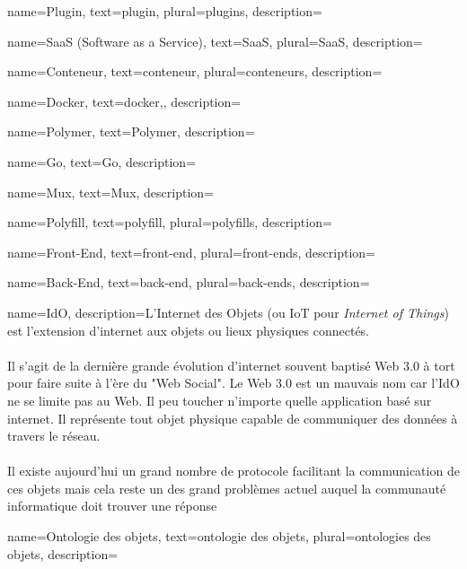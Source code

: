 \makeglossaries

{
    name=Plugin,
    text=plugin,
    plural=plugins,
    description={}
}

{
    name=SaaS (Software as a Service),
    text=SaaS,
    plural=SaaS,
    description={}
}

{
    name=Conteneur,
    text=conteneur,
    plural=conteneurs,
    description={}
}

{
    name=Docker,
    text=docker,,
    description={}
}

{
    name=Polymer,
    text=Polymer,
    description={}
}

{
    name=Go,
    text=Go,
    description={}
}

{
    name=Mux,
    text=Mux,
    description={}
}

{
    name=Polyfill,
    text=polyfill,
    plural=polyfills,
    description={}
}

{
    name=Front-End,
    text=front-end,
    plural=front-ends,
    description={}
}

{
    name=Back-End,
    text=back-end,
    plural=back-ends,
    description={}
}

{
    name=IdO,
    description={L'Internet des Objets (ou IoT pour \textit{Internet of Things}) est l'extension d'internet aux objets ou lieux physiques connectés.\\\\
    Il s'agit de la dernière grande évolution d'internet souvent baptisé Web 3.0 à tort pour faire suite à l'ère du "Web Social". Le Web 3.0 est un mauvais nom car l'IdO ne se limite pas au Web. Il peu toucher n'importe quelle application basé sur internet. Il représente tout objet physique capable de communiquer des données à travers le réseau. \\\\
    Il existe aujourd'hui un grand nombre de protocole facilitant la communication de ces objets mais cela reste un des grand problèmes actuel auquel la communauté informatique doit trouver une réponse}
}

{
    name=Ontologie des objets,
    text=ontologie des objets,
    plural=ontologies des objets,
    description={}
}

